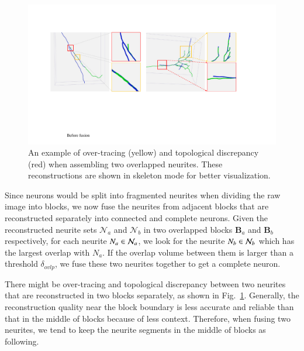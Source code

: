 \begin{figure}[b]
	\centering
	\includegraphics[width=0.9\columnwidth]{./Illustrations/fusion_errors.pdf}
	\caption{An example of over-tracing (yellow) and topological discrepancy (red) when assembling two overlapped neurites. These reconstructions are shown in skeleton mode for better visualization.}
	\label{fig:overlap_discrepancy}
\end{figure}
Since neurons would be split into fragmented neurites when dividing the raw image into blocks, we now fuse the neurites from adjacent blocks that are reconstructed separately into connected and complete neurons.
Given the reconstructed neurite sets $\mathcal{N}_a$ and $\mathcal{N}_b$ in two overlapped blocks $\mathbf{B}_a$ and $\mathbf{B}_b$ respectively, for each neurite ${N}_{a}\in \mathcal{N}_{a}$, we look for the neurite ${N}_{b}\in \mathcal{N}_{b}$ which has the largest overlap with ${N}_{a}$. 
If the overlap volume between them is larger than a threshold $\delta_{ovlp}$, we fuse these two neurites together to get a complete neuron.

There might be over-tracing and topological discrepancy between two neurites that are reconstructed in two blocks separately, as shown in Fig.~\ref{fig:overlap_discrepancy}.
Generally, the reconstruction quality near the block boundary is less accurate and reliable than that in the middle of blocks because of less context. 
Therefore, when fusing two neurites, we tend to keep the neurite segments in the middle of blocks as following. 
  
